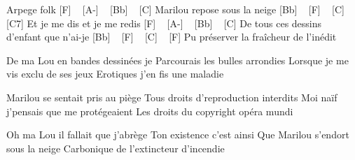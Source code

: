 
Arpege folk
[F] ~ [A-] ~ [Bb] ~ [C] 
Marilou repose sous la neige
[Bb] ~ [F] ~ [C] ~ [C7] 
Et je me dis et je me redis
[F] ~ [A-] ~ [Bb] ~ [C] 
De tous ces dessins d'enfant que n'ai-je
[Bb] ~ [F] ~ [C] ~ [F]
Pu préserver la fraîcheur de l'inédit

De ma Lou en bandes dessinées je
Parcourais les bulles arrondies
Lorsque je me vis exclu de ses jeux
Erotiques j'en fis une maladie

Marilou se sentait pris au piège
Tous droits d'reproduction interdits
Moi naïf j'pensais que me protégeaient
Les droits du copyright opéra mundi

Oh ma Lou il fallait que j'abrège
Ton existence c'est ainsi
Que Marilou s'endort sous la neige
Carbonique de l'extincteur d'incendie 